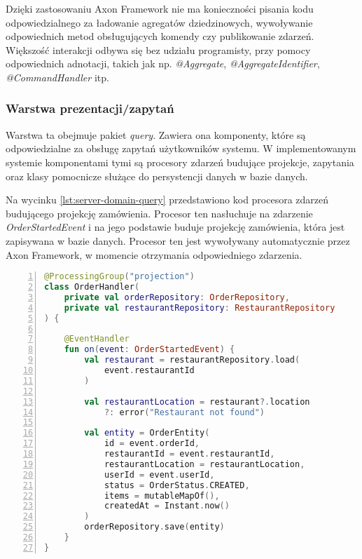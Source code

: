 Dzięki zastosowaniu Axon Framework nie ma konieczności pisania kodu odpowiedzialnego za ładowanie agregatów dziedzinowych, wywoływanie odpowiednich metod obsługujących komendy czy publikowanie zdarzeń. Większość interakcji odbywa się bez udziału programisty, przy pomocy odpowiednich adnotacji, takich jak np. \textit{@Aggregate}, \textit{@AggregateIdentifier}, \textit{@CommandHandler} itp.

\subsubsection{Warstwa prezentacji/zapytań}

Warstwa ta obejmuje pakiet \textit{query}. Zawiera ona komponenty, które są odpowiedzialne za obsługę zapytań użytkowników systemu. W implementowanym systemie komponentami tymi są procesory zdarzeń budujące projekcje, zapytania oraz klasy pomocnicze służące do persystencji danych w bazie danych.

Na wycinku \ref{lst:server-domain-query} przedstawiono kod procesora zdarzeń budującego projekcję zamówienia. Procesor ten nasłuchuje na zdarzenie \textit{OrderStartedEvent} i na jego podstawie buduje projekcję zamówienia, która jest zapisywana w bazie danych. Procesor ten jest wywoływany automatycznie przez Axon Framework, w momencie otrzymania odpowiedniego zdarzenia.

\begin{lstlisting}[caption={Kod procesora zdarzeń budującego projekcję zamówienia},label={lst:server-domain-query},captionpos=b,language=Kotlin,numbers=left,showstringspaces=false]
@ProcessingGroup("projection")
class OrderHandler(
    private val orderRepository: OrderRepository,
    private val restaurantRepository: RestaurantRepository
) {

    @EventHandler
    fun on(event: OrderStartedEvent) {
        val restaurant = restaurantRepository.load(
            event.restaurantId
        )

        val restaurantLocation = restaurant?.location 
            ?: error("Restaurant not found")

        val entity = OrderEntity(
            id = event.orderId,
            restaurantId = event.restaurantId,
            restaurantLocation = restaurantLocation,
            userId = event.userId,
            status = OrderStatus.CREATED,
            items = mutableMapOf(),
            createdAt = Instant.now()
        )
        orderRepository.save(entity)
    }
}
\end{lstlisting}

